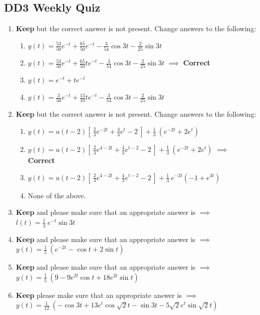 \documentclass[11pt]{article}
\begin{document}
\subsection*{DD3 Weekly Quiz}

\begin{enumerate}
	\item \textbf{Keep} but the correct answer is not present. Change answers to the following:
		\begin{enumerate}
			\item $y(t)=\frac{53}{50}e^{-t}+\frac{65}{50}e^{-t}-\frac{3}{54}\cos{3t}-\frac{2}{25}\sin{3t}$
			\item $y(t)=\frac{53}{50}e^{-t}+\frac{65}{50}te^{-t}-\frac{3}{54}\cos{3t}-\frac{2}{25}\sin{3t}$ $\implies$ \textbf{Correct}
			\item $y(t)=e^{-t}+te^{-t}$
			\item $y(t)=\frac{3}{50}e^{-t}+\frac{13}{10}te^{-t}-\frac{3}{54}\cos{3t}-\frac{2}{25}\sin{3t}$
		\end{enumerate}
	\item \textbf{Keep} but the correct answer is not present. Change answers to the following:
		\begin{enumerate}
			\item $y(t)=u(t-2)[\ \frac{2}{3}e^{-2t}+\frac{4}{3}e^{t}-2\ ]+\frac{1}{3}\ (e^{-2t}+2e^{t})$
			\item $y(t)=u(t-2)[\ \frac{2}{3}e^{4-2t}+\frac{4}{3}e^{t-2}-2\ ]+\frac{1}{3}\ (e^{-2t}+2e^{t})$ $\implies$ \textbf{Correct}
			\item $y(t)=u(t-2)[\ \frac{2}{3}e^{4-2t}+\frac{4}{3}e^{t-2}-2\ ]+\frac{1}{3}\ e^{-2 t}(-1 + e^{3 t})$
			\item None of the above.
		\end{enumerate}
	\item \textbf{Keep} and please make sure that an appropriate answer is $\implies$ $l(t)=\frac{1}{3}\ e^{-t}\sin{3t}$
	\item \textbf{Keep} and please make sure that an appropriate answer is $\implies$ $y(t)=\frac{1}{5}\ (e^{-2t}-\cos{t}+2\sin{t})$
	\item \textbf{Keep} and please make sure that an appropriate answer is $\implies$ $y(t)=\frac{1}{5}\ (9-9 e^{2 t}\cos{t} + 18 e^{2 t}\sin{t})$
	\item \textbf{Keep} please make sure that an appropriate answer is $\implies$ $y(t)=\frac{1}{12}\ (-\cos{3 t} + 13 e^{t}\cos{\sqrt{2} t} - \sin{3 t} - 
   5 \sqrt{2} e^{t} \sin{\sqrt{2} t})$
\end{enumerate}
\end{document}
